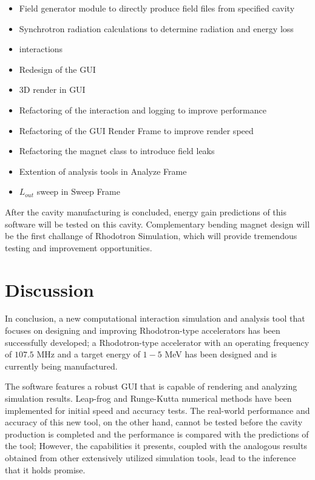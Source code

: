 \documentclass[a4paper,oneside,12pt]{report}
\numberwithin{equation}{chapter}
\begin{document}
{\begin{itemize}
    \item Field generator module to directly produce field files from specified cavity
    \item Synchrotron radiation calculations to determine radiation and energy loss
    \item \ee interactions
    \item Redesign of the GUI
    \item 3D render in GUI
    \item Refactoring of the \eEM interaction and logging to improve performance
    \item Refactoring of the GUI Render Frame to improve render speed
    \item Refactoring the magnet class to introduce field leaks
    \item Extention of analysis tools in Analyze Frame
    \item $L_{out}$ sweep in Sweep Frame
\end{itemize} 


After the cavity manufacturing is concluded, energy gain predictions of this software will be tested on this cavity. 
Complementary bending magnet design will be the first challange of Rhodotron Simulation, which will provide tremendous testing and improvement opportunities.

\section{Discussion}
In conclusion, a new computational \eEM interaction simulation and analysis tool that focuses on designing and improving Rhodotron-type accelerators has been successfully developed; 
a Rhodotron-type accelerator with an operating frequency of $107.5$ MHz and a target energy of $1-5$ MeV has been designed and is currently being manufactured.

The software features a robust GUI that is capable of rendering and analyzing simulation results.
Leap-frog and Runge-Kutta numerical methods have been implemented for initial speed and accuracy tests.
The real-world performance and accuracy of this new tool, on the other hand, cannot be tested
before the cavity production is completed and the performance is compared with the predictions of the tool;
However, the capabilities it presents, coupled with the analogous results obtained from other extensively utilized simulation tools, 
lead to the inference that it holds promise.

\newpage

}
\end{document}
